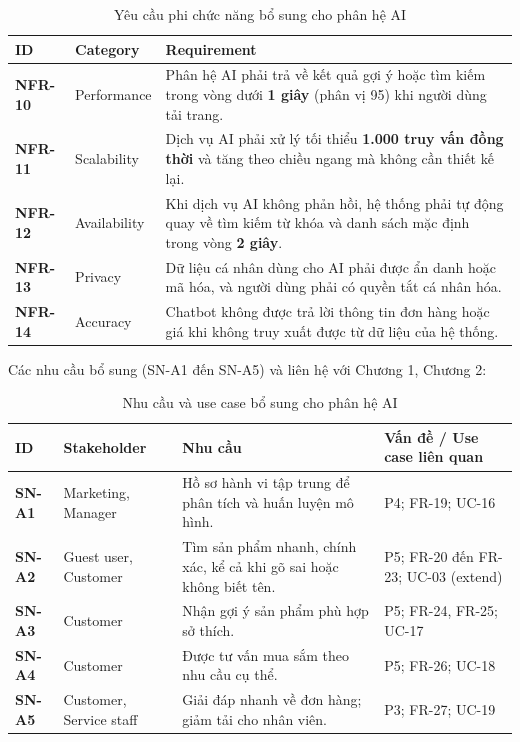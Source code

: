 \documentclass[12pt,a4paper,oneside]{report}
\begin{document}
\begin{longtable}{p{1.6cm}p{2.6cm}p{11.8cm}}
\caption{Yêu cầu phi chức năng bổ sung cho phân hệ AI}\\
\toprule
\textbf{ID} & \textbf{Category} & \textbf{Requirement} \\
\midrule
\endhead
\bottomrule
\endlastfoot
\textbf{NFR-10} & Performance & Phân hệ AI phải trả về kết quả gợi ý hoặc tìm kiếm trong vòng dưới \textbf{1 giây} (phân vị 95) khi người dùng tải trang. \\
\textbf{NFR-11} & Scalability & Dịch vụ AI phải xử lý tối thiểu \textbf{1.000 truy vấn đồng thời} và tăng theo chiều ngang mà không cần thiết kế lại. \\
\textbf{NFR-12} & Availability & Khi dịch vụ AI không phản hồi, hệ thống phải tự động quay về tìm kiếm từ khóa và danh sách mặc định trong vòng \textbf{2 giây}. \\
\textbf{NFR-13} & Privacy & Dữ liệu cá nhân dùng cho AI phải được ẩn danh hoặc mã hóa, và người dùng phải có quyền tắt cá nhân hóa. \\
\textbf{NFR-14} & Accuracy & Chatbot không được trả lời thông tin đơn hàng hoặc giá khi không truy xuất được từ dữ liệu của hệ thống. \\
\end{longtable}

Các nhu cầu bổ sung (SN-A1 đến SN-A5) và liên hệ với Chương 1, Chương 2:

\begin{longtable}{p{1.8cm}p{3cm}p{6.4cm}p{4.8cm}}
\caption{Nhu cầu và use case bổ sung cho phân hệ AI}\\
\toprule
\textbf{ID} & \textbf{Stakeholder} & \textbf{Nhu cầu} & \textbf{Vấn đề / Use case liên quan} \\
\midrule
\endhead
\bottomrule
\endlastfoot
\textbf{SN-A1} & Marketing, Manager & Hồ sơ hành vi tập trung để phân tích và huấn luyện mô hình. & P4; FR-19; UC-16 \\
\textbf{SN-A2} & Guest user, Customer & Tìm sản phẩm nhanh, chính xác, kể cả khi gõ sai hoặc không biết tên. & P5; FR-20 đến FR-23; UC-03 (extend) \\
\textbf{SN-A3} & Customer & Nhận gợi ý sản phẩm phù hợp sở thích. & P5; FR-24, FR-25; UC-17 \\
\textbf{SN-A4} & Customer & Được tư vấn mua sắm theo nhu cầu cụ thể. & P5; FR-26; UC-18 \\
\textbf{SN-A5} & Customer, Service staff & Giải đáp nhanh về đơn hàng; giảm tải cho nhân viên. & P3; FR-27; UC-19 \\
\end{longtable}
\end{document}
